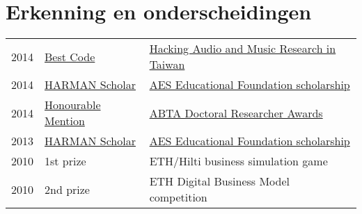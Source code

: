 \documentclass[a4paper]{deedy-resume} %
\begin{document}
\begin{minipage}[t]{0.65\textwidth}

\section{Erkenning en onderscheidingen} 

\begin{tabular}{@{}rll}
2014	 & \href{http://labrosa.ee.columbia.edu/hamr_ismir2014/proceedings/doku.php?id=intelligent_audio_switch_box}{Best Code} & \href{http://labrosa.ee.columbia.edu/hamr_ismir2014/proceedings/doku.php?id=intelligent_audio_switch_box}{Hacking Audio and Music Research in Taiwan}\\
2014 & \href{http://www.aes.org/education/foundation/awards.cfm}{HARMAN Scholar} & \href{http://www.aes.org/education/foundation/awards.cfm}{AES Educational Foundation scholarship}\\
2014 & \href{http://www.abtanet.org.uk/Awards/Detail/6/2014-ABTA-Doctoral-Researcher-Awards/}{Honourable Mention} & \href{http://www.abtanet.org.uk/Awards/Detail/6/2014-ABTA-Doctoral-Researcher-Awards/}{ABTA Doctoral Researcher Awards} \\
2013 & \href{http://www.aes.org/press/?ID=215}{HARMAN Scholar} & \href{http://www.aes.org/press/?ID=215}{AES Educational Foundation scholarship}\\
2010 & 1st prize & ETH/Hilti business simulation game\\
2010 & 2nd prize & ETH Digital Business Model competition
\end{tabular}

\sectionspace %



\end{minipage} %





\end{document}

